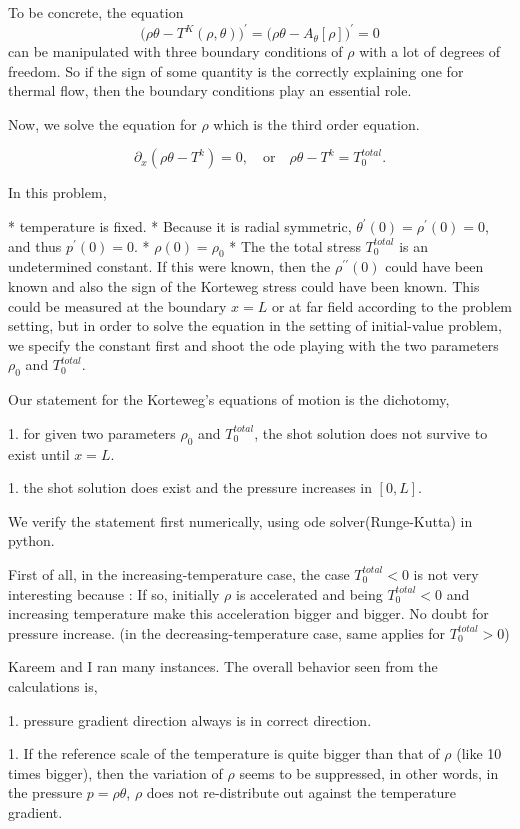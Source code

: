 \documentclass[a4paper,12pt]{article}
\begin{document}
To be concrete, the equation {{{$$ \big(\rho\theta - T^K(\rho,\theta)\big)^\prime = \big( \rho\theta - A_\theta[\rho] \big)^\prime = 0 $$}}} can be manipulated with three boundary conditions of $\rho$ with a lot of degrees of freedom. So if the sign of some quantity is the correctly explaining one for thermal flow, then the boundary conditions play an essential role.

Now, we solve the equation for $\rho$ which is the third order equation.

{{{$$ \partial_x(\rho\theta - T^k) = 0, \quad \text{or} \quad \rho\theta - T^k = T^{total}_0.$$}}}

In this problem,

 * temperature is fixed.
 * Because it is radial symmetric, {{{$\theta^\prime(0) = \rho^\prime(0)=0$, and thus $p^\prime(0)=0$.}}}
 * {{{$\rho(0)= \rho_0$}}}
 * The the total stress {{{$T^{total}_0$}}} is an undetermined constant. If this were known, then the {{{$\rho^{\prime\prime}(0)$}}} could have been known and also the sign of the Korteweg stress could have been known. This could be measured at the boundary $x=L$ or at far field according to the problem setting, but in order to solve the equation in the setting of initial-value problem, we specify the constant first and shoot the ode playing with the two parameters {{{$\rho_0$}}} and {{{$T^{total}_0$}}}.

Our statement for the Korteweg's equations of motion is the dichotomy,

 1. for given two parameters {{{$\rho_0$}}} and {{{$T^{total}_0$}}}, the shot solution does not survive to exist until $x=L$.

 1. the shot solution does exist and the pressure increases in $[0,L]$.

We verify the statement first numerically, using ode solver(Runge-Kutta) in python.

First of all, in the increasing-temperature case, the case {{{$T^{total}_0<0$}}} is not very interesting because : If so, initially $\rho$ is accelerated and being {{{$T^{total}_0<0$}}} and increasing temperature make this acceleration bigger and bigger. No doubt for pressure increase. (in the decreasing-temperature case, same applies for {{{$T^{total}_0>0$}}})

Kareem and I ran many instances. The overall behavior seen from the calculations is,

 1. pressure gradient direction always is in correct direction.

 1. If the reference scale of the temperature is quite bigger than that of $\rho$ (like 10 times bigger), then the variation of $\rho$ seems to be suppressed, in other words, in the pressure $p=\rho\theta$, $\rho$ does not re-distribute out against the temperature gradient.
\end{document}
